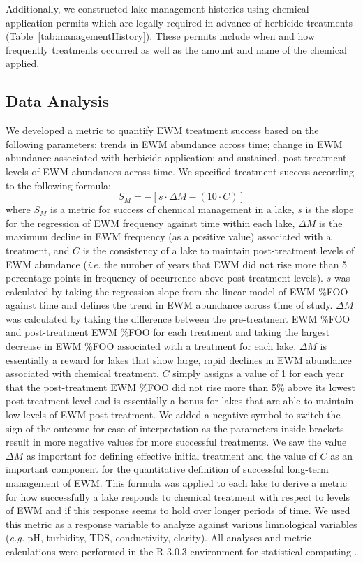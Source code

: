 \documentclass{article}
\begin{document}
Additionally, we constructed lake management histories using  chemical application permits which are legally required in advance of herbicide treatments (Table~\ref{tab:managementHistory}). These permits include when and how frequently treatments occurred as well as the amount and name of the chemical applied.

\subsection*{\small Data Analysis}

We developed a metric to quantify EWM treatment success based on the following parameters: trends in EWM abundance across time; change in EWM abundance associated with herbicide application; and sustained, post-treatment levels of EWM abundances across time. We specified treatment success according to the  following formula: 
$$S_{M} = -[s \cdot \Delta M - (10 \cdot C)]$$ 
where $S_{M}$ is a metric for success of chemical management in a lake, $s$ is the slope for the regression of EWM frequency against time within each lake, $\Delta M$ is the maximum decline in EWM frequency (as a positive value) associated with a treatment, and $C$ is the consistency of a lake to maintain post-treatment levels of EWM abundance (\emph{i.e.} the number of years that EWM did not rise more than 5 percentage points in frequency of occurrence above post-treatment levels). $s$ was calculated by taking the regression slope from the linear model of EWM \%FOO against time and defines the trend in EWM abundance across time of study. $\Delta M$ was calculated by taking the difference between the pre-treatment EWM \%FOO and post-treatment EWM \%FOO for each treatment and taking the largest decrease in EWM \%FOO associated with a treatment for each lake. $\Delta M$ is essentially a reward for lakes that show large, rapid declines in EWM abundance associated with chemical treatment. $C$ simply assigns a value of 1 for each year that the post-treatment EWM \%FOO did not rise more than 5\% above its lowest post-treatment level and is essentially a bonus for lakes that are able to maintain low levels of EWM post-treatment. We added a negative symbol to switch the sign of the outcome for ease of interpretation as the parameters inside brackets result in more negative values for more successful treatments. We saw the value $\Delta M$ as important for defining effective initial treatment and the value of $C$ as an important component for the quantitative definition of successful long-term management of EWM. This formula was applied to each lake to derive a metric for how successfully a lake responds to chemical treatment with respect to levels of EWM and if this response seems to hold over longer periods of time. We used this metric as a response variable to analyze against various limnological variables (\emph{e.g.} pH, turbidity, TDS, conductivity, clarity). All analyses and metric calculations were performed in the R 3.0.3 environment for statistical computing \citep{R}. 
\end{document}
